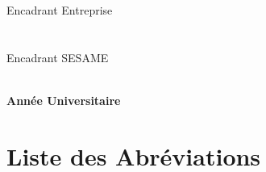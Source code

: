 \documentclass[12pt,a4paper,oneside]{report}
\begin{document}
\begin{titlepage}
\begin{center}
    \vspace{0.65cm}

    {\fontsize{14}{17}\selectfont\sffamily Encadrant Entreprise}\\[0.25cm]
    {\fontsize{13}{16}\selectfont\bfseries\sffamily \industrialAdvisor}\\[0.15cm]
    {\color{black!35}\makebox[0.45\linewidth]{\dotfill}}\\[0.45cm]
    {\fontsize{14}{17}\selectfont\sffamily Encadrant SESAME}\\[0.25cm]
    {\fontsize{13}{16}\selectfont\bfseries\sffamily \academicAdvisor}\\[0.15cm]
    {\color{black!35}\makebox[0.45\linewidth]{\dotfill}}

    \vfill

    {\fontsize{12}{15}\selectfont\bfseries\sffamily Année Universitaire}\\[0.15cm]
    {\fontsize{12}{15}\selectfont\bfseries\sffamily \academicYear}

\end{center}
\restoregeometry
\end{titlepage}
\hypersetup{pageanchor=true}

\setcounter{page}{1}





\tableofcontents
\newpage
\listoffigures
\newpage
\listoftables
\newpage

\chapter*{Liste des Abréviations}
\end{document}

